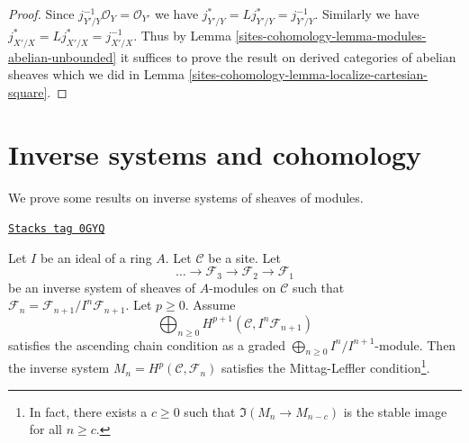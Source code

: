 \begin{proof}
Since $j_{Y'/Y}^{-1}\mathcal{O}_Y = \mathcal{O}_{Y'}$ we have
$j_{Y'/Y}^* = Lj_{Y'/Y}^* = j_{Y'/Y}^{-1}$. Similarly we have
$j_{X'/X}^* = Lj_{X'/X}^* = j_{X'/X}^{-1}$. Thus by
Lemma \ref{sites-cohomology-lemma-modules-abelian-unbounded} it suffices
to prove the result on derived categories of abelian sheaves
which we did in
Lemma \ref{sites-cohomology-lemma-localize-cartesian-square}.
\end{proof}

\section{Inverse systems and cohomology}
\label{sites-cohomology-section-inverse-systems}
We prove some results on inverse systems of sheaves of modules.

\begin{lemma}[ML general]
\label{sites-cohomology-lemma-ML-general}
\href{https://stacks.math.columbia.edu/tag/0GYQ}{\texttt{Stacks tag 0GYQ}}

Let $I$ be an ideal of a ring $A$. Let $\mathcal{C}$ be a site.
Let
$$
\ldots \to \mathcal{F}_3 \to \mathcal{F}_2 \to \mathcal{F}_1
$$
be an inverse system of sheaves of $A$-modules on $\mathcal{C}$
such that $\mathcal{F}_n = \mathcal{F}_{n + 1}/I^n\mathcal{F}_{n + 1}$.
Let $p \geq 0$. Assume
$$
\bigoplus\nolimits_{n \geq 0} H^{p + 1}(\mathcal{C}, I^n\mathcal{F}_{n + 1})
$$
satisfies the ascending chain condition as a graded
$\bigoplus_{n \geq 0} I^n/I^{n + 1}$-module.
Then the inverse system $M_n = H^p(\mathcal{C}, \mathcal{F}_n)$ satisfies the
Mittag-Leffler condition\footnote{In fact, there exists
a $c \geq 0$ such that $\Im(M_n \to M_{n - c})$ is the stable image
for all $n \geq c$.}.
\end{lemma}

